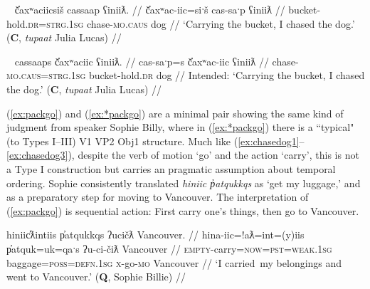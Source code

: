 \ex~ \label{ex:chasedog2}
\begingl
\glpreamble č̓axʷaciicsiš cassaap ʕiniiƛ. //
\gla č̓axʷac-iic=siˑš cas-saˑp ʕiniiƛ //
\glb bucket-hold.\textsc{dr}=\textsc{strg.1sg} chase-\textsc{mo.caus} dog //
\glft `Carrying the bucket, I chased the dog.' (\textbf{C}, \textit{tupaat} Julia Lucas) //
\endgl
\xe

\ex~ \label{ex:chasedog3}
\begingl
\glpreamble *cassaaps č̓axʷaciic ʕiniiƛ. //
\gla cas-saˑp=s č̓axʷac-iic ʕiniiƛ //
\glb chase-\textsc{mo.caus}=\textsc{strg.1sg} bucket-hold.\textsc{dr} dog //
\glft Intended: `Carrying the bucket, I chased the dog.' (\textbf{C}, \textit{tupaat} Julia Lucas) //
\endgl
\xe


(\ref{ex:packgo}) and (\ref{ex:*packgo}) are a minimal pair showing the same kind of judgment from speaker Sophie Billy, where in (\ref{ex:*packgo}) there is a ``typical" (to Types I--III) V1 VP2 Obj1 structure. Much like (\ref{ex:chasedog1}--\ref{ex:chasedog3}), despite the verb of motion `go' and the action `carry', this is not a Type I construction but carries an pragmatic assumption about temporal ordering. Sophie consistently translated \textit{hiniic p̓atqukkqs} as `get my luggage,' and as a preparatory step for moving to Vancouver. The interpretation of (\ref{ex:packgo}) is sequential action: First carry one's things, then go to Vancouver.

\ex \label{ex:packgo}
\begingl
\glpreamble hiniic̓ƛintiis p̓atqukkqs ʔucičƛ Vancouver. //
\gla hina-iic=!aƛ=int=(y)iis p̓atquk=uk=qaˑs ʔu-ci-čiƛ Vancouver //
\glb \textsc{empty}-carry=\textsc{now}=\textsc{pst}=\textsc{weak.1sg} baggage=\textsc{poss}=\textsc{defn.1sg} \textsc{x}-go-\textsc{mo} Vancouver //
\glft `I carried\footnotemark\ my belongings and went to Vancouver.' (\textbf{Q}, Sophie Billie) //
\endgl
\xe


